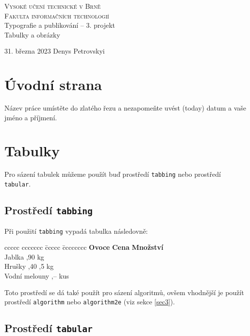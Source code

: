 \documentclass[a4paper, 11pt]{article}
\begin{document}
\begin{titlepage}
    \begin{center}
        {\Huge\textsc{Vysoké učení technické v Brně} \\}
        \huge
        \textsc{Fakulta informačních technologií}\\
            \LARGE
            Typografie a publikování -- 3. projekt \\
            \Huge
            Tabulky a obrázky
    \end{center}
    {\Large 31. března 2023 \hfill Denys Petrovskyi}
\end{titlepage}

\section{Úvodní strana}

Název práce umístěte do zlatého řezu a nezapomeňte uvést  (today) datum a vaše jméno a příjmení.

\section{Tabulky}

Pro sázení tabulek můžeme použít buď prostředí \verb|tabbing| nebo prostředí \verb|tabular|.

\subsection{Prostředí \texttt{tabbing}}
Při použití \verb|tabbing| vypadá tabulka následovně:
\begin{tabbing}
    ccccc ccccccc \quad \= ccccc \quad \= cccccccc \kill
    \textbf{Ovoce} \> \textbf{Cena} \> \textbf{Množství} \\
    Jablka ,90  kg \\
    Hrušky ,40 ,5 kg \\
    Vodní melouny ,--  kus \\
\end{tabbing}
Toto prostředí se dá také použít pro sázení algoritmů, ovšem vhodnější je použít prostředí \verb|algorithm| nebo
\verb|algorithm2e| (viz sekce \ref{sec3}).

\subsection{Prostředí \texttt{tabular}}
\end{document}
